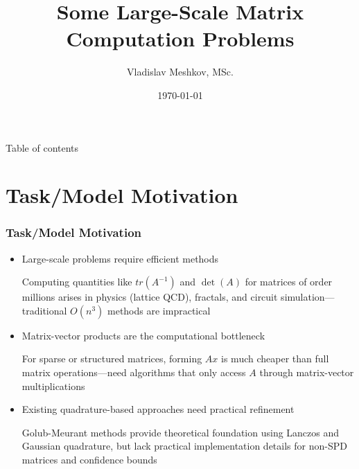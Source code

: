 \documentclass[aspectratio=169, 12pt]{beamer}
\title[\hbox to 56mm{Matrix Computation}]{Some Large-Scale Matrix Computation Problems}
\author[V.\,M.~Meshkov]{Vladislav Meshkov, MSc.}
\institute{Moscow Institute of Physics and Technology}
\date{\today}
\begin{document}
\maketitle

\begin{frame}{Table of contents}
    \tableofcontents
\end{frame}

\section{Task/Model Motivation}
\begin{frame}
\frametitle{Task/Model Motivation}
\begin{itemize}
\item Large-scale problems require efficient methods

    Computing quantities like \(tr(A^{-1})\) and \(\det(A)\) for matrices of order millions arises in physics (lattice QCD), fractals, and circuit simulation---traditional \(O(n^3)\) methods are impractical

\item Matrix-vector products are the computational bottleneck

    For sparse or structured matrices, forming \(Ax\) is much cheaper than full matrix operations---need algorithms that only access \(A\) through matrix-vector multiplications

\item Existing quadrature-based approaches need practical refinement

    Golub-Meurant methods provide theoretical foundation using Lanczos and Gaussian quadrature, but lack practical implementation details for non-SPD matrices and confidence bounds
\end{itemize}
\end{frame}
\end{document}
